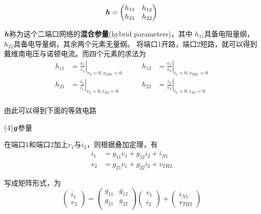     \[
    \textbf{\textit{h}}=
    \begin{pmatrix}
        h_{11} & h_{12} \\
        h_{21} & h_{22} \\
    \end{pmatrix}
    \]
    \par $\textbf{\textit{h}}$称为这个二端口网络的\textbf{混合参量}(hybrid parameters)，其中
    $h_{11}$具备电阻量纲，$h_{22}$具备电导量纲，其余两个元素无量纲。
    将端口1开路，端口2短路，就可以得到戴维南电压与诺顿电流。而四个元素的求法为
    \begin{align*}
        h_{11}&=\left.\frac{v_1}{i_1}\right|_{v_2=0,v_{TH1}=0} \qquad&
        h_{12}&=\left.\frac{v_1}{v_2}\right|_{i_1=0,v_{TH1}=0} \\
        h_{21}&=\left.\frac{i_2}{i_1}\right|_{v_2=0,i_{N2}=0} \qquad&
        h_{22}&=\left.\frac{i_2}{v_2}\right|_{i_1=0,i_{N2}=0} \\
    \end{align*}
    \par 由此可以得到下面的等效电路
    \begin{center}
        \qquad
    \end{center}
    \par (4)$\textbf{\textit{g}}$参量
    \par 在端口1和端口2加上$v_{1}$与$i_{2}$，则根据叠加定理，有
    \begin{align*}
        i_1&=g_{11}v_1+g_{12}i_2+i_{N1}\\
        v_2&=g_{21}v_1+g_{22}i_2+v_{TH2}
    \end{align*}
    \par 写成矩阵形式，为
    \[
    \begin{pmatrix}
        i_1\\v_2
    \end{pmatrix}=
    \begin{pmatrix}
        g_{11} & g_{12} \\
        g_{21} & g_{22} \\
    \end{pmatrix}
    \begin{pmatrix}
        v_{1} \\ i_{2}
    \end{pmatrix}
    +
    \begin{pmatrix}
        i_{N1} \\ v_{TH2}
    \end{pmatrix}
    \]
